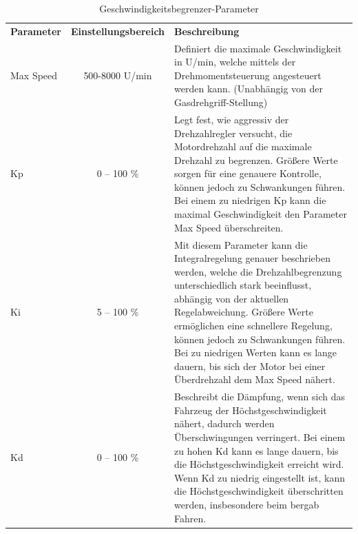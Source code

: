 \vspace{1cm}


\setlength{\tabcolsep}{9pt}
\begin{table}[H]
	\begin{tabular}{|lcp{8cm}|}\hline
	\rowcolor[gray]{0.8}\textbf{Parameter} & \textbf{Einstellungsbereich} &\textbf{Beschreibung}\\[2pt]
		Max Speed 	& 500-8000 U/min 	& Definiert die maximale Geschwindigkeit in U/min, welche mittels der Drehmomentsteuerung angesteuert werden kann. (Unabhängig von der Gasdrehgriff-Stellung)\\\hline
		Kp 			& 0 – 100 \% 		& Legt fest, wie aggressiv der Drehzahlregler versucht, die Motordrehzahl auf die maximale Drehzahl zu begrenzen. Größere Werte sorgen für eine genauere Kontrolle, können jedoch zu Schwankungen führen. Bei einem zu niedrigen Kp kann die maximal Geschwindigkeit den Parameter Max Speed überschreiten.\\\hline
		Ki 			& 5 – 100 \% 		& Mit diesem Parameter kann die Integralregelung genauer beschrieben werden, welche die Drehzahlbegrenzung unterschiedlich stark beeinflusst, abhängig von der aktuellen Regelabweichung. Größere Werte ermöglichen eine schnellere Regelung, können jedoch zu Schwankungen führen. Bei zu niedrigen Werten kann es lange dauern, bis sich der Motor bei einer Überdrehzahl dem Max Speed nähert. \\\hline
		Kd    		& 0 – 100 \% 		& Beschreibt die Dämpfung, wenn sich das Fahrzeug der Höchstgeschwindigkeit nähert, dadurch werden Überschwingungen verringert. Bei einem zu hohen Kd kann es lange dauern, bis die Höchstgeschwindigkeit erreicht wird. Wenn Kd zu niedrig eingestellt ist, kann die Höchstgeschwindigkeit überschritten werden, insbesondere beim bergab Fahren. \\\hline		
	\end{tabular}	
	\caption{Geschwindigkeitsbegrenzer-Parameter}
	\label{tab:Geschwindigkeitsbegrenzer-Parameter}
\end{table}


